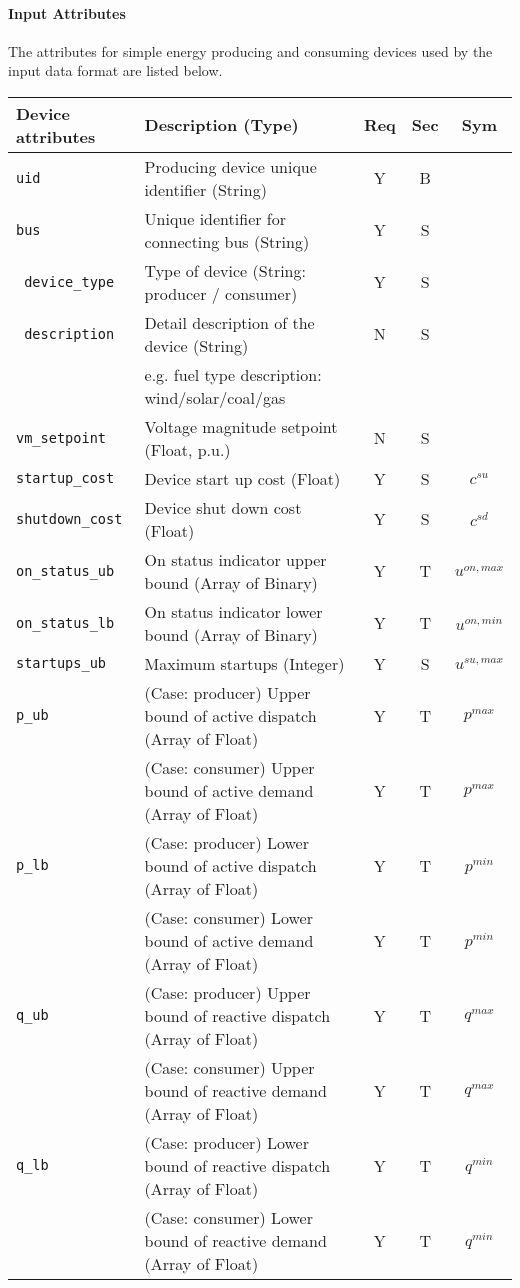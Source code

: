 \documentclass{article}
\begin{document}
\paragraph{Input Attributes} The attributes for 
simple energy producing and consuming devices used by the input data format are listed below.

\begin{center}
\small
\begin{tabular}{ l | l | c | c | c |}
Device attributes & Description (Type) & Req & Sec & Sym\\
\hline
  {\tt uid} & Producing device unique identifier (String) & Y & B &  \\
  {\tt bus} & Unique identifier for connecting bus (String)& Y & S & \\
  {\tt\color{red} device\_type} & Type of device (String: producer / consumer) & Y & S & \\
  {\tt\color{red} description} & Detail description of the device  (String) & N & S & \\
      &e.g. fuel type description: wind/solar/coal/gas  &  &  & \\
  {\tt vm\_setpoint} & Voltage magnitude setpoint (Float, p.u.) & N & S & \\
  {\tt startup\_cost} & Device start up cost (Float) & Y & S & $c^{su}$\\
  {\tt shutdown\_cost} & Device shut down cost (Float) & Y & S & $c^{sd}$\\  
  {\tt on\_status\_ub} & On status indicator upper bound (Array of Binary) & Y & T & $u^{on,max}$\\
  {\tt on\_status\_lb} & On status indicator lower bound (Array of Binary) & Y & T & $u^{on,min}$\\

  {\tt startups\_ub} & Maximum startups (Integer) & Y & S & $u^{su,max}$\\  
  {\tt p\_ub} & { (Case: producer) Upper bound of active dispatch (Array of Float)   }& Y & T & $p^{max}$ \\
              & { (Case: consumer) Upper bound of active demand   (Array of Float)   }& Y & T & $p^{max}$ \\
  {\tt p\_lb} & { (Case: producer) Lower bound of active dispatch (Array of Float)   }& Y & T & $p^{min}$ \\
              & { (Case: consumer) Lower bound of active demand   (Array of Float)   }& Y & T & $p^{min}$ \\
  {\tt q\_ub} & { (Case: producer) Upper bound of reactive dispatch (Array of Float) }& Y & T & $q^{max}$\\
              & { (Case: consumer) Upper bound of reactive demand   (Array of Float) }& Y & T & $q^{max}$\\
  {\tt q\_lb} & { (Case: producer) Lower bound of reactive dispatch (Array of Float) }& Y & T & $q^{min}$\\ 
              & { (Case: consumer) Lower bound of reactive demand   (Array of Float) }& Y & T & $q^{min}$\\ 


\end{tabular}
\end{center}
\end{document}
